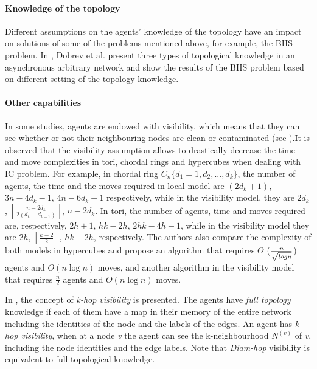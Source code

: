 \paragraph{Knowledge of the topology} 
Different assumptions on the agents' knowledge of the topology have an impact on solutions of some of the problems mentioned above, for example, the BHS problem. In \cite{Dobr}, Dobrev et al. present three types of topological knowledge in an asynchronous arbitrary network and show the results of the BHS problem based on different setting of the topology knowledge.

\paragraph{Other capabilities}
In some studies, agents are endowed with   visibility, which means that they can see whether or not their neighbouring nodes are clean or contaminated (see \cite{M.Huang, M.Huang1}).It is observed that the visibility assumption allows   to drastically decrease the time and move complexities in tori, chordal rings and hypercubes when dealing with IC problem. For example, in chordal ring $C_n\{d_1=1,d_2,...,d_k\}$, the number of agents, the time and the moves required in local model are $(2d_k+1)$, $3n-4d_k-1$, $4n-6d_k-1$ respectively, while in the visibility model, they are $2d_k$, $\left \lceil \frac{n-2d_{k}}{2(d_{k}-d_{k-1})} \right \rceil$, $n-2d_k$. In tori, the number of agents,   time and   moves required are, respectively,  $2h+1$, $hk-2h$, $2hk-4h-1$, while  in the  visibility model they are $2h$, $\left \lceil \frac{k-2}{2} \right \rceil$, $hk-2h$, respectively. The authors also compare the complexity of both models in hypercubes  and propose an algorithm that requires $\Theta$  ($n \over { \sqrt {log n}} $) agents and $O(n \log n)$ moves, and another algorithm   in the visibility model that requires $\frac{n}{2}$ agents and $O(n \log n)$ moves.

In \cite{Cai3}, the concept of {\em k-hop visibility} is presented. The agents have   {\em full topology} knowledge if each of them have a map in their memory  of the entire network including the identities of the node and the labels of the edges. An agent has {\em k-hop visibility}, when at a node {\em v} the agent can see the k-neighbourhood $N^{(v)}$ of {\em v}, including the node identities and the edge labels. Note that {\em Diam-hop} visibility is equivalent to full topological knowledge. 


